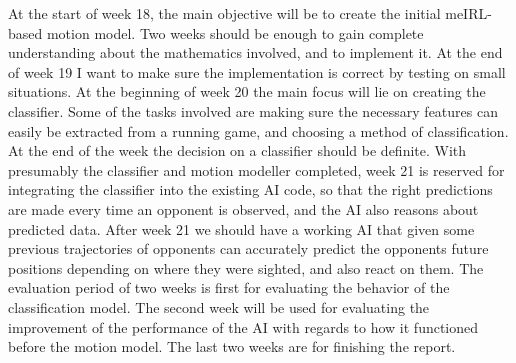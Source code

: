 \documentclass[a4paper, 12pt]{article}
\begin{document}
At the start of week 18,
the main objective will be to create the initial meIRL-based
motion model. Two weeks should be enough to gain complete understanding about
the mathematics involved, and to implement it. At the end of week 19 I want to
make sure the implementation is correct by testing on small situations. At the
beginning of week 20 the main focus will lie on creating the classifier. Some of
the tasks involved are making sure the necessary features can easily be
extracted from a running game, and choosing a method of classification. At the
end of the week the decision on a classifier should be definite.
With presumably the classifier and motion modeller completed, week 21 is
reserved for integrating the classifier into the existing AI code, so that the
right predictions are made every time an opponent is observed, and the AI also
reasons about predicted data. After week 21 we should have a working AI that given
some previous trajectories of opponents can accurately predict the opponents
future positions depending on where they were sighted, and also react on them.
The evaluation period of two weeks is first for evaluating the behavior of the
classification model. The second week will be used for evaluating
the improvement of the performance of the AI with regards to how it functioned
before the motion model.
The last two weeks are for finishing the report.



\end{document}
